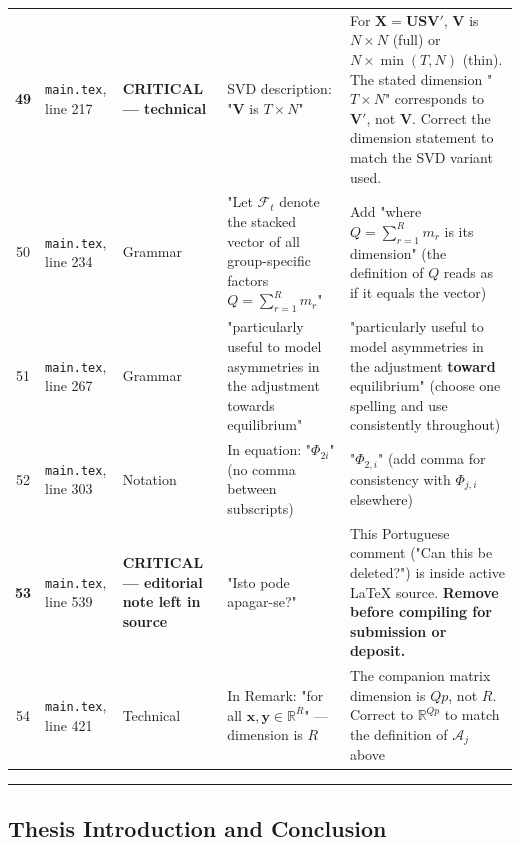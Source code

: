 \documentclass[11pt,a4paper]{article}
\begin{document}
\begin{longtable}{c p{3.2cm} l p{3.8cm} p{3.5cm}}
\textbf{49} & \texttt{main.tex}, line 217 & \textbf{CRITICAL — technical} & SVD description: "$\boldsymbol{V}$ is $T \times N$" & For $\boldsymbol{X} = \boldsymbol{U}\boldsymbol{S}\boldsymbol{V}'$, $\boldsymbol{V}$ is $N \times N$ (full) or $N \times \min(T,N)$ (thin). The stated dimension "$T \times N$" corresponds to $\boldsymbol{V}'$, not $\boldsymbol{V}$. Correct the dimension statement to match the SVD variant used. \\
50 & \texttt{main.tex}, line 234 & Grammar & "Let $\boldsymbol{\mathcal{F}}_t$ denote the stacked vector of all group-specific factors $Q=\sum_{r=1}^R m_r$" & Add "where $Q=\sum_{r=1}^R m_r$ is its dimension" (the definition of $Q$ reads as if it equals the vector) \\
51 & \texttt{main.tex}, line 267 & Grammar & "particularly useful to model asymmetries in the adjustment towards equilibrium" & "particularly useful to model asymmetries in the adjustment \textbf{toward} equilibrium" (choose one spelling and use consistently throughout) \\
52 & \texttt{main.tex}, line 303 & Notation & In equation: "$\Phi_{2i}$" (no comma between subscripts) & "$\Phi_{2,i}$" (add comma for consistency with $\Phi_{j,i}$ elsewhere) \\
\textbf{53} & \texttt{main.tex}, line 539 & \textbf{CRITICAL — editorial note left in source} & "Isto pode apagar-se?" & This Portuguese comment ("Can this be deleted?") is inside active LaTeX source. \textbf{Remove before compiling for submission or deposit.} \\
54 & \texttt{main.tex}, line 421 & Technical & In Remark: "for all $\mathbf{x}, \mathbf{y} \in \mathbb{R}^R$" — dimension is $R$ & The companion matrix dimension is $Qp$, not $R$. Correct to $\mathbb{R}^{Qp}$ to match the definition of $\mathcal{A}_j$ above \\
\bottomrule
\end{longtable}


\medskip\hrule\medskip

\subsection*{Thesis Introduction and Conclusion}
\end{document}
